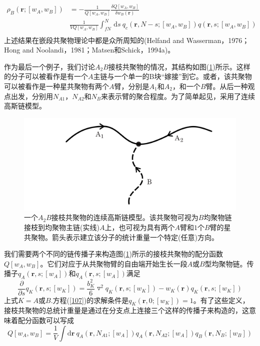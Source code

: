\begin{equation}
\begin{aligned}
\rho _B(\mathbf{r};[w_A,w_B]) & =-\frac{1}{Q[w_A,w_B]}	\frac{\delta Q[w_A,w_B]}{\delta w_B(\mathbf{r})} \\
& \frac{1}{VQ[w_A,w_B]} \int _{fN}^{N}\,\mathrm{d}s~q_c(\mathbf{r},N-s;[w_A,w_B])q(\mathbf{r},s;[w_A,w_B]) \\
\end{aligned}	
\end{equation}
上述结果在嵌段共聚物理论中都是众所周知的(Helfand and Wasserman，1976；Hong and Noolandi，1981；Matsen和Schick，1994a)。

作为最后一个例子，我们讨论$A_2B$接枝共聚物的情况，其结构如图(\ref{3.8})所示。这样的分子可以被看作是有一个$A$主链与一个单一的B块“嫁接”到它。或者，该共聚物可以被看作是一种星共聚物有两个$A$臂，分别是$A_1$和$A_2$，和一个$B$臂。从后一种观点出发，分别用$N_{A1}$，$N_{A2}$和$N_B$来表示臂的聚合程度。为了简单起见，采用了连续高斯链模型。

\begin{figure}[H]
\centering
\includegraphics[scale=0.7]{./figures/38.png}
\caption{一个$A_2B$接枝共聚物的连续高斯链模型。该共聚物可视为$B$均聚物链接枝到均聚物主链(实线)$A$上，也可视为具有两个$A$臂和$1$个$B$臂的星共聚物。箭头表示建立该分子的统计重量一个特定(任意)方向。}
\label{3.8}
\end{figure}		

我们需要两个不同的链传播子来构造图(\ref{3.8})所示的接枝共聚物的配分函数$Q[w_A,w_B]$。它们对应于从共聚物臂的自由端开始生长一段$A$或$B$型均聚物链。传播子$q_A(\mathbf{r},s;[w_A])$和$q_A(\mathbf{r},s;[w_A])$满足
\begin{equation}
\frac{\partial}{\partial s}q_K(\mathbf{r},s;[w_K])=\frac{b_K^2}{6}\triangledown ^2q_K(\mathbf{r},s;[w_K])-w_K(\mathbf{r})q_K(\mathbf{r},s;[w_K]) \label{107}
\end{equation}
上式$K=A$或$B$.方程(\ref{107})的求解条件是$q_K(\mathbf{r},0;[w_K])=1$。有了这些定义，接枝共聚物的总统计重量是通过在分支点上连接三个这样的传播子来构造的，这意味着配分函数可以写成
\begin{equation}
Q[w_A,w_B]=\frac{1}{V}\int \mathrm{d}\mathbf{r}~q_A(\mathbf{r},N_{A1};[w_A])q_A(\mathbf{r},N_{A2};[w_A])q_B(\mathbf{r},N_B;[w_B])
\end{equation}

